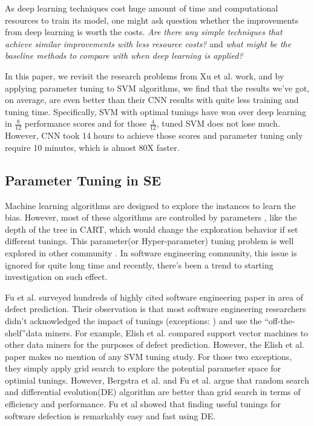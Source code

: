 As deep learning techniques cost huge amount of time and computational
resources to train its model,
one might ask question whether the improvements from deep learning is worth
the costs. {\it Are there any simple techniques that achieve similar improvements
with less resource costs?} and {\it what might be the baseline methods to compare with
when deep learning is applied?}

In this paper, we revisit the research problems 
from Xu et al.\cite{xu2016predicting} work, and by applying parameter tuning 
to SVM algorithms, we find that the results we've got, on average, are even 
better than their CNN results with quite less training and tuning time.
Specifically, SVM with optimal tunings have won over deep learning 
in $\frac{8}{12}$ performance scores and for those $\frac{4}{12}$,
tuned SVM  does not lose much. However, CNN took 14 hours to achieve
those scores and parameter tuning only require 10 minutes, which is almost 80X faster.

\subsection{Parameter Tuning in SE}
Machine learning algorithms are designed to explore the instances
to learn the bias. However, most of these algorithms are controlled by parameters
, like the depth of the tree in CART, which would change the
exploration behavior if set different tunings. This parameter(or Hyper-parameter)
tuning problem is well explored in other community \cite{bergstra2012random,li2016hyperband}.
In software engineering community, this issue is ignored for quite
long time and recently, there's been a trend to starting investigation on such effect.

Fu et al.\cite{fu2016tuning} surveyed hundreds of highly 
cited software engineering paper in area of defect prediction. 
Their observation is that most software engineering  researchers
didn't acknowledged the impact of tunings 
(exceptions: \cite{lessmann2008benchmarking,tantithamthavorn2016automated}) and
use the ``off-the-shelf''data miners. For example, 
Elish et al.\cite{elish2008predicting} compared support vector machines
to other data miners for the purposes of defect prediction.
However, the Elish et al. paper makes no mention of any SVM tuning study.
For those two exceptions\cite{lessmann2008benchmarking,tantithamthavorn2016automated}, 
they simply apply grid search to explore the potential parameter space for optimial tunings.
However, Bergstra et al.\cite{bergstra2012random} and 
Fu et al.\cite{fu2016differential} argue that random search and 
differential evolution(DE) algorithm are better than 
grid search in terms of efficiency and performance.
Fu et al showed that finding useful tunings for software defection is remarkably easy and fast using DE.

